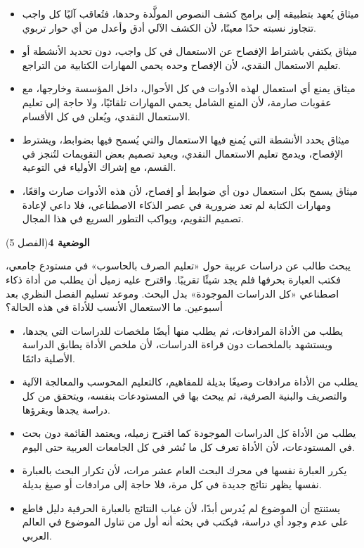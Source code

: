 \documentclass[11pt,a4paper]{article}
\begin{document}
\begin{itemize}[leftmargin=1.0cm, labelsep=6pt, itemsep=3pt, topsep=4pt, parsep=0pt]
  \item[\textbf{أ)}] ميثاق يُعهد بتطبيقه إلى برامج كشف النصوص المولَّدة وحدها، فتُعاقب آليًا كل واجب تتجاوز نسبته حدًا معينًا، لأن الكشف الآلي أدق وأعدل من أي حوار تربوي.
  \item[\textbf{ب)}] ميثاق يكتفي باشتراط الإفصاح عن الاستعمال في كل واجب، دون تحديد الأنشطة أو تعليم الاستعمال النقدي، لأن الإفصاح وحده يحمي المهارات الكتابية من التراجع.
  \item[\textbf{ج)}] ميثاق يمنع أي استعمال لهذه الأدوات في كل الأحوال، داخل المؤسسة وخارجها، مع عقوبات صارمة، لأن المنع الشامل يحمي المهارات تلقائيًا، ولا حاجة إلى تعليم الاستعمال النقدي، ويُعلن في كل الأقسام.
  \item[\textbf{د)}] ميثاق يحدد الأنشطة التي يُمنع فيها الاستعمال والتي يُسمح فيها بضوابط، ويشترط الإفصاح، ويدمج تعليم الاستعمال النقدي، ويعيد تصميم بعض التقويمات لتُنجز في القسم، مع إشراك الأولياء في التوعية.
  \item[\textbf{هـ)}] ميثاق يسمح بكل استعمال دون أي ضوابط أو إفصاح، لأن هذه الأدوات صارت واقعًا، ومهارات الكتابة لم تعد ضرورية في عصر الذكاء الاصطناعي، فلا داعي لإعادة تصميم التقويم، ويواكب التطور السريع في هذا المجال.
\end{itemize}
\par\vspace{6pt}
\noindent
{\large\khatt\textbf{الوضعية 4}}\hfill{\small(الفصل 5)}\par\nopagebreak\vspace{3pt}
\setlength{\fboxsep}{7pt}\colorbox{gray!10}{\parbox{\dimexpr\linewidth-14pt}{يبحث طالب عن دراسات عربية حول «تعليم الصرف بالحاسوب» في مستودع جامعي، فكتب العبارة بحرفها فلم يجد شيئًا تقريبًا. واقترح عليه زميل أن يطلب من أداة ذكاء اصطناعي «كل الدراسات الموجودة» بدل البحث. وموعد تسليم الفصل النظري بعد أسبوعين. ما الاستعمال الأنسب للأداة في هذه الحالة؟}}\par\nopagebreak
\begin{itemize}[leftmargin=1.0cm, labelsep=6pt, itemsep=3pt, topsep=4pt, parsep=0pt]
  \item[\textbf{أ)}] يطلب من الأداة المرادفات، ثم يطلب منها أيضًا ملخصات للدراسات التي يجدها، ويستشهد بالملخصات دون قراءة الدراسات، لأن ملخص الأداة يطابق الدراسة الأصلية دائمًا.
  \item[\textbf{ب)}] يطلب من الأداة مرادفات وصيغًا بديلة للمفاهيم، كالتعليم المحوسب والمعالجة الآلية والتصريف والبنية الصرفية، ثم يبحث بها في المستودعات بنفسه، ويتحقق من كل دراسة يجدها ويقرؤها.
  \item[\textbf{ج)}] يطلب من الأداة كل الدراسات الموجودة كما اقترح زميله، ويعتمد القائمة دون بحث في المستودعات، لأن الأداة تعرف كل ما نُشر في كل الجامعات العربية حتى اليوم.
  \item[\textbf{د)}] يكرر العبارة نفسها في محرك البحث العام عشر مرات، لأن تكرار البحث بالعبارة نفسها يظهر نتائج جديدة في كل مرة، فلا حاجة إلى مرادفات أو صيغ بديلة.
  \item[\textbf{هـ)}] يستنتج أن الموضوع لم يُدرس أبدًا، لأن غياب النتائج بالعبارة الحرفية دليل قاطع على عدم وجود أي دراسة، فيكتب في بحثه أنه أول من تناول الموضوع في العالم العربي.
\end{itemize}
\end{document}
